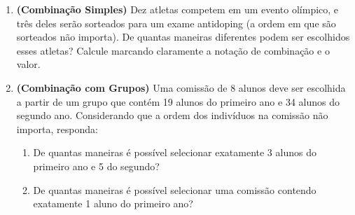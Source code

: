 \documentclass[12pt]{article}
\begin{document}
\begin{enumerate}
\vspace{0.2cm}
\begin{tcolorbox}[colback=white, colframe=maincolor, height=3.5cm, arc=2mm, boxrule=1pt]
\end{tcolorbox}


\item \textbf{(Combinação Simples)} Dez atletas competem em um evento olímpico, e três deles serão sorteados para um exame antidoping (a ordem em que são sorteados não importa). De quantas maneiras diferentes podem ser escolhidos esses atletas? Calcule marcando claramente a notação de combinação e o valor.
\vspace{0.3cm}
\begin{center}
\end{center}

\vspace{0.2cm}
\begin{tcolorbox}[colback=white, colframe=maincolor, height=3.5cm, arc=2mm, boxrule=1pt]
\end{tcolorbox}


\item \textbf{(Combinação com Grupos)} Uma comissão de 8 alunos deve ser escolhida a partir de um grupo que contém 19 alunos do primeiro ano e 34 alunos do segundo ano. Considerando que a ordem dos indivíduos na comissão não importa, responda:
\begin{enumerate}[label=\alph*)]
    \item De quantas maneiras é possível selecionar exatamente 3 alunos do primeiro ano e 5 do segundo?
\vspace{0.2cm}
\begin{tcolorbox}[colback=white, colframe=maincolor, height=2.5cm, arc=2mm, boxrule=1pt]
\end{tcolorbox}

    \item De quantas maneiras é possível selecionar uma comissão contendo exatamente 1 aluno do primeiro ano?
\vspace{0.2cm}
\begin{tcolorbox}[colback=white, colframe=maincolor, height=2.5cm, arc=2mm, boxrule=1pt]
\end{tcolorbox}


\end{enumerate}
\end{enumerate}
\end{document}
